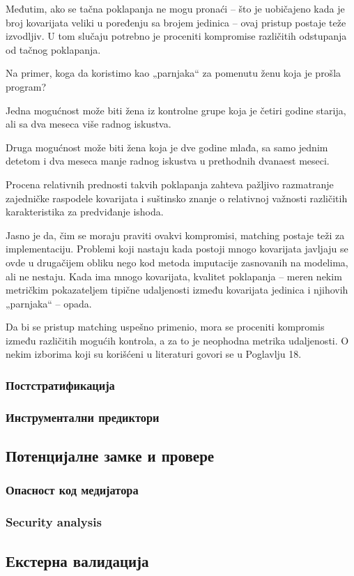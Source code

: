 \documentclass[12pt, a4paper]{article}
\begin{document}
Međutim, ako se tačna poklapanja ne mogu pronaći – što je uobičajeno kada je broj kovarijata veliki u poređenju sa brojem jedinica – ovaj pristup postaje teže izvodljiv. U tom slučaju potrebno je proceniti kompromise različitih odstupanja od tačnog poklapanja.

Na primer, koga da koristimo kao „parnjaka“ za pomenutu ženu koja je prošla program?

Jedna mogućnost može biti žena iz kontrolne grupe koja je četiri godine starija, ali sa dva meseca više radnog iskustva.

Druga mogućnost može biti žena koja je dve godine mlađa, sa samo jednim detetom i dva meseca manje radnog iskustva u prethodnih dvanaest meseci.

Procena relativnih prednosti takvih poklapanja zahteva pažljivo razmatranje zajedničke raspodele kovarijata i suštinsko znanje o relativnoj važnosti različitih karakteristika za predviđanje ishoda.

Jasno je da, čim se moraju praviti ovakvi kompromisi, matching postaje teži za implementaciju. Problemi koji nastaju kada postoji mnogo kovarijata javljaju se ovde u drugačijem obliku nego kod metoda imputacije zasnovanih na modelima, ali ne nestaju. Kada ima mnogo kovarijata, kvalitet poklapanja – meren nekim metričkim pokazateljem tipične udaljenosti između kovarijata jedinica i njihovih „parnjaka“ – opada.

Da bi se pristup matching uspešno primenio, mora se proceniti kompromis između različitih mogućih kontrola, a za to je neophodna metrika udaljenosti. O nekim izborima koji su korišćeni u literaturi govori se u Poglavlju 18.
\subsubsection{Постстратификација}
\subsubsection{Инструментални предиктори}
\subsection{Потенцијалне замке и провере}
\subsubsection{Опасност код медијатора}
\subsubsection{Security analysis}
\subsection{Екстерна валидација}
\end{document}
